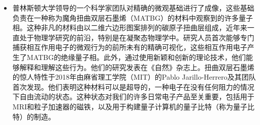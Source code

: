 \documentclass{beamer}
\begin{document}
\begin{frame}
 \begin{itemize}
        \item 普林斯顿大学领导的一个科学家团队对精确的微观基础进行了成像，这些基础负责在一种称为魔角扭曲双层石墨烯（MATBG）的材料中观察到的许多量子相。这种非凡的材料由以二维六边形图案排列的碳原子扭曲层组成，近年来一直处于物理学研究的前沿，特别是在凝聚态物理学中。研究人员首次能够专门捕获相互作用电子的微观行为的前所未有的精确可视化，这些相互作用电子产生了MATBG的绝缘量子相。此外，通过使用新颖和创新的理论技术，他们能够解释和理解这些行为。他们的研究发表在《自然》杂志上。扭曲双层石墨烯的惊人特性于2018年由麻省理工学院（MIT）的Pablo Jarillo-Herrero及其团队首次发现。他们表明这种材料可以是超导的，一种电子在没有任何阻力的情况下自由流动的状态。这种状态对我们的许多日常电子产品至关重要，包括用于MRI和粒子加速器的磁铁，以及用于构建量子计算机的量子比特（称为量子比特）的制造。
    \end{itemize}    
\end{frame}
\end{document}

